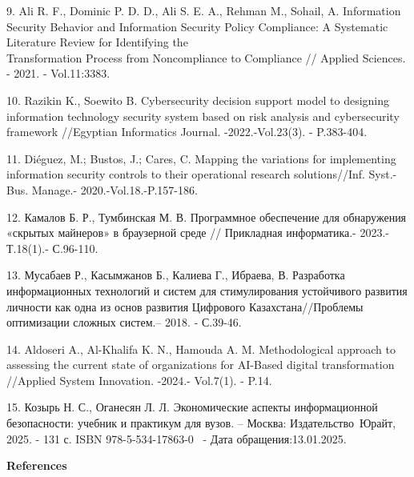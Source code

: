 \begin{references}
9. Ali R. F., Dominic P. D. D., Ali S. E. A., Rehman M., Sohail, A.
Information Security Behavior and Information Security Policy
Compliance: A Systematic Literature Review for Identifying the\\
Transformation Process from Noncompliance to Compliance // Applied
Sciences. - 2021. - Vol.11:3383.
\href{https://doi.org/10.3390/app11083383}{}

10. Razikin K., Soewito B. Cybersecurity decision support model to
designing information technology security system based on risk analysis
and cybersecurity framework //Egyptian Informatics Journal.
-2022.-Vol.23(3). - P.383-404.
\href{https://doi.org/10.1016/j.eij.2022.03.001}{}

11. Diéguez, M.; Bustos, J.; Cares, C. Mapping the variations for
implementing information security controls to their operational research
solutions//Inf. Syst.-Bus. Manage.- 2020.-Vol.18.-P.157-186.
~\href{https://doi.org/10.1007/s10257-020-00470-8}{}

12. Камалов Б. Р., Тумбинская М. В. Программное обеспечение для
обнаружения «скрытых майнеров» в браузерной среде // Прикладная
информатика.- 2023.-Т.18(1).- С.96-110.
\href{\%20https:/doi.org/10.37791/2687-0649-2023-18-1-96-110}{}

13. Мусабаев Р., Касымжанов Б., Калиева Г., Ибраева, В. Разработка
информационных технологий и систем для стимулирования устойчивого
развития личности как одна из основ развития Цифрового
Казахстана//Проблемы оптимизации сложных систем.-- 2018. - С.39-46.

14. Aldoseri A., Al-Khalifa K. N., Hamouda A. M. Methodological approach
to assessing the current state of organizations for AI-Based digital
transformation //Applied System Innovation. -2024.- Vol.7(1). - P.14.
\href{https://doi.org/10.3390/asi7010014}{}

15. Козырь Н. С., Оганесян Л. Л. Экономические аспекты информационной
безопасности: учебник и практикум для вузов. -- Москва:
Издательство~Юрайт, 2025. - 131 с. ISBN 978-5-534-17863-0
\href{https://urait.ru/bcode/568708}{}~-
Дата обращения:13.01.2025.
\end{references}

\begin{center}
{\bfseries References}
\end{center}

